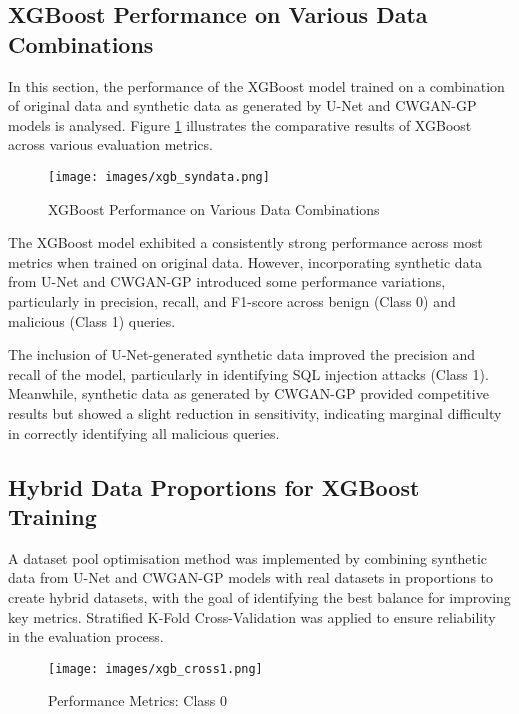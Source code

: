 \documentclass[journal]{IEEEtran}
\begin{document}
\subsection{XGBoost Performance on Various Data Combinations}

In this section, the performance of the XGBoost model trained on a combination of original data and synthetic data as generated by U-Net and CWGAN-GP models is analysed. Figure \ref{fig:xgboost_performance} illustrates the comparative results of XGBoost across various evaluation metrics.

\begin{figure}[H]
    \centering
    \texttt{[image: images/xgb\_syndata.png]}
    \caption{XGBoost Performance on Various Data Combinations}
    \label{fig:xgboost_performance}
\end{figure}

The XGBoost model exhibited a consistently strong performance across most metrics when trained on original data. However, incorporating synthetic data from U-Net and CWGAN-GP introduced some performance variations, particularly in precision, recall, and F1-score across benign (Class 0) and malicious (Class 1) queries.

The inclusion of U-Net-generated synthetic data improved the precision and recall of the model, particularly in identifying SQL injection attacks (Class 1). Meanwhile, synthetic data as generated by CWGAN-GP provided competitive results but showed a slight reduction in sensitivity, indicating marginal difficulty in correctly identifying all malicious queries.

\subsection{Hybrid Data Proportions for XGBoost Training}

A dataset pool optimisation method was implemented by combining synthetic data from U-Net and CWGAN-GP models with real datasets in proportions to create hybrid datasets, with the goal of identifying the best balance for improving key metrics. Stratified K-Fold Cross-Validation was applied to ensure reliability in the evaluation process.

\begin{figure}[H]
    \centering
    \texttt{[image: images/xgb\_cross1.png]}
    \caption{Performance Metrics: Class 0}
    \label{fig:class0_metrics}
\end{figure}
\end{document}
